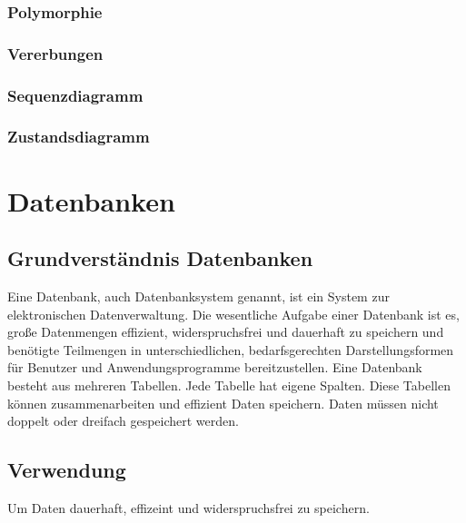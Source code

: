 \documentclass[12pt,a4paper]{article}
\begin{document}
\subsubsection{Polymorphie}

\subsubsection{Vererbungen}

\subsubsection{Sequenzdiagramm}

\subsubsection{Zustandsdiagramm}

\section{Datenbanken}
\subsection{Grundverständnis Datenbanken}
    Eine Datenbank, auch Datenbanksystem genannt, ist ein System zur elektronischen Datenverwaltung. Die wesentliche Aufgabe einer Datenbank ist es, große Datenmengen effizient, widerspruchsfrei und dauerhaft zu speichern und benötigte Teilmengen in unterschiedlichen, bedarfsgerechten Darstellungsformen für Benutzer und Anwendungsprogramme bereitzustellen.
    Eine Datenbank besteht aus mehreren Tabellen. Jede Tabelle hat eigene Spalten. Diese Tabellen können zusammenarbeiten und effizient Daten speichern. Daten müssen nicht doppelt oder dreifach gespeichert werden.

\subsection{Verwendung}
    Um Daten dauerhaft, effizeint und widerspruchsfrei zu speichern.
\end{document}
